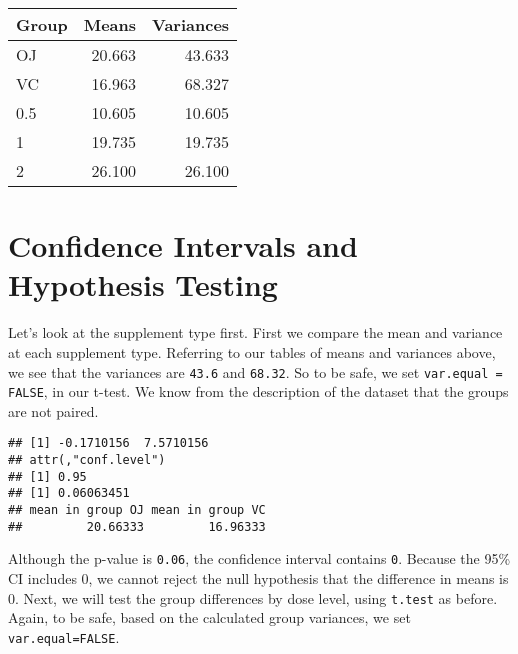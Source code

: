 \documentclass[]{article}
\newenvironment{Shaded}{\begin{snugshade}}{\end{snugshade}}
\newcommand{\KeywordTok}[1]{\textcolor[rgb]{0.13,0.29,0.53}{\textbf{{#1}}}}
\newcommand{\DataTypeTok}[1]{\textcolor[rgb]{0.13,0.29,0.53}{{#1}}}
\newcommand{\StringTok}[1]{\textcolor[rgb]{0.31,0.60,0.02}{{#1}}}
\newcommand{\OtherTok}[1]{\textcolor[rgb]{0.56,0.35,0.01}{{#1}}}
\newcommand{\NormalTok}[1]{{#1}}
\begin{document}
\begin{table}[ht]
\centering
\begin{tabular}{lrr}
  \hline
Group & Means & Variances \\ 
  \hline
OJ & 20.663 & 43.633 \\ 
  VC & 16.963 & 68.327 \\ 
  0.5 & 10.605 & 10.605 \\ 
  1 & 19.735 & 19.735 \\ 
  2 & 26.100 & 26.100 \\ 
   \hline
\end{tabular}
\end{table}

\section{Confidence Intervals and Hypothesis
Testing}\label{confidence-intervals-and-hypothesis-testing}

Let's look at the supplement type first. First we compare the mean and
variance at each supplement type. Referring to our tables of means and
variances above, we see that the variances are \texttt{43.6} and
\texttt{68.32}. So to be safe, we set \texttt{var.equal = FALSE}, in our
t-test. We know from the description of the dataset that the groups are
not paired.

\begin{Shaded}
\end{Shaded}

\begin{verbatim}
## [1] -0.1710156  7.5710156
## attr(,"conf.level")
## [1] 0.95
## [1] 0.06063451
## mean in group OJ mean in group VC 
##         20.66333         16.96333
\end{verbatim}

Although the p-value is \texttt{0.06}, the confidence interval contains
\texttt{0}. Because the 95\% CI includes 0, we cannot reject the null
hypothesis that the difference in means is 0. Next, we will test the
group differences by dose level, using \texttt{t.test} as before. Again,
to be safe, based on the calculated group variances, we set
\texttt{var.equal=FALSE}.
\end{document}
